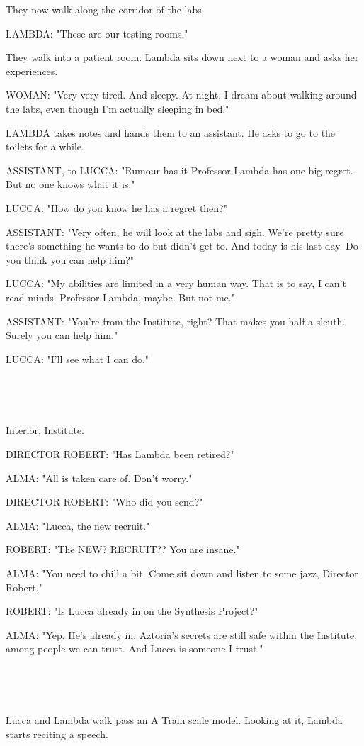 \documentclass[11pt]{article}
\begin{document}
They now walk along the corridor of the labs.

LAMBDA: "These are our testing rooms."

They walk into a patient room.
Lambda sits down next to a woman and asks her experiences.

WOMAN: "Very very tired. 
And sleepy. 
At night, I dream about walking around the labs, even though I'm actually sleeping in bed."

LAMBDA takes notes and hands them to an assistant.
He asks to go to the toilets for a while.

ASSISTANT, to LUCCA: "Rumour has it Professor Lambda has one big regret.
But no one knows what it is."

LUCCA: "How do you know he has a regret then?"

ASSISTANT: "Very often, he will look at the labs and sigh.
We're pretty sure there's something he wants to do but didn't get to.
And today is his last day.
Do you think you can help him?"

LUCCA: "My abilities are limited in a very human way.
That is to say, I can't read minds.
Professor Lambda, maybe. But not me."

ASSISTANT: "You're from the Institute, right? 
That makes you half a sleuth.
Surely you can help him."

LUCCA: "I'll see what I can do."

\ 

\ 

Interior, Institute.

DIRECTOR ROBERT: "Has Lambda been retired?"

ALMA: "All is taken care of. Don't worry."

DIRECTOR ROBERT: "Who did you send?"

ALMA: "Lucca, the new recruit."

ROBERT: "The NEW? RECRUIT?? You are insane."

ALMA: "You need to chill a bit.
Come sit down and listen to some jazz, Director Robert."

ROBERT: "Is Lucca already in on the Synthesis Project?"

ALMA: "Yep. He's already in. 
Aztoria's secrets are still safe within the Institute, among people we can trust.
And Lucca is someone I trust."

\ 

\ 

Lucca and Lambda walk pass an A Train scale model.
Looking at it, Lambda starts reciting a speech.
\end{document}
